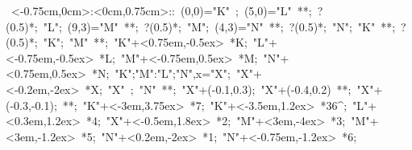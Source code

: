 

\hbox{
\xy    <-0.75cm,0cm>:<0cm,0.75cm>::
       (0,0)="K" ; (5,0)="L" **\dir{-};  ?(0.5)*\dir{<<};
       "L"; (9,3)="M" **\dir{-}; ?(0.5)*\dir{>}; 
       "M"; (4,3)="N" **\dir{-};  ?(0.5)*\dir{>>};
       "N"; "K" **\dir{-}; ?(0.5)*\dir{<};
       "K"; "M" **\dir{-}; 
       "K"+<0.75em,-0.5ex> *{K};
       "L"+<-0.75em,-0.5ex> *{L};
       "M"+<-0.75em,0.5ex> *{M};
       "N"+<0.75em,0.5ex> *{N};  {"K";"M":"L";"N",x}="X";  "X"+<-0.2em,-2ex> *{X};
       "X" ; "N" **\dir{-}; 
       "X"+(-0.1,0.3); "X"+(-0.4,0.2) **\dir{-}; "X"+(-0.3,-0.1); **\dir{-}; 
       "K"+<-3em,3.75ex> *{7};  "K"+<-3.5em,1.2ex> *{36^\circ};  
       "L"+<0.3em,1.2ex> *{4};  "X"+<-0.5em,1.8ex> *{2};
       "M"+<3em,-4ex> *{3};   "M"+<3em,-1.2ex> *{5};
       "N"+<0.2em,-2ex> *{1};  "N"+<-0.75em,-1.2ex> *{6};
       \endxy}
	   
